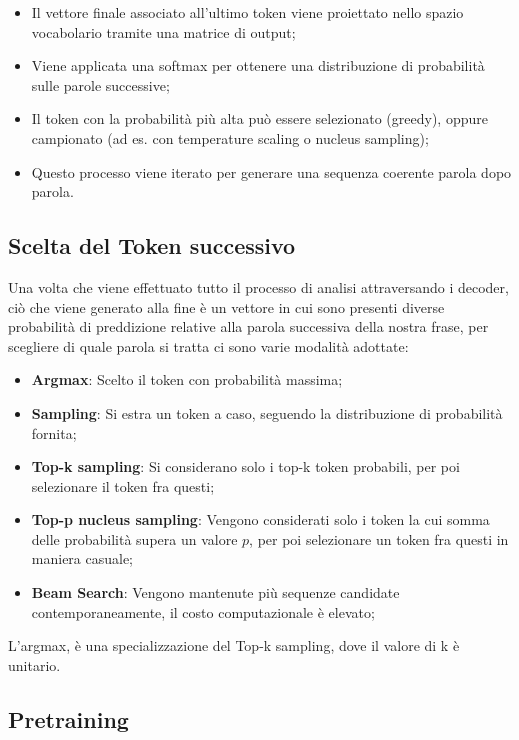 \begin{itemize}
    \item Il vettore finale associato all’ultimo token viene proiettato nello spazio vocabolario tramite una matrice di output;
    \item Viene applicata una softmax per ottenere una distribuzione di probabilità sulle parole successive;
    \item Il token con la probabilità più alta può essere selezionato (greedy), oppure campionato (ad es. con temperature scaling o nucleus sampling);
    \item Questo processo viene iterato per generare una sequenza coerente parola dopo parola.
\end{itemize}

\subsection{Scelta del Token successivo}
Una volta che viene effettuato tutto il processo di analisi attraversando i decoder, ciò che viene generato alla fine è un vettore in cui sono presenti diverse probabilità di preddizione relative alla parola successiva della nostra frase, per scegliere di quale parola si tratta ci sono varie modalità adottate:

\begin{itemize}
    \item\textbf{Argmax}: Scelto il token con probabilità massima;
    \item\textbf{Sampling}: Si estra un token a caso, seguendo la distribuzione di probabilità fornita;
    \item\textbf{Top-k sampling}: Si considerano solo i top-k token probabili, per poi selezionare il token fra questi;
    \item\textbf{Top-p nucleus sampling}: Vengono considerati solo i token la cui somma delle probabilità supera un valore $p$, per poi selezionare un token fra questi in maniera casuale;
    \item\textbf{Beam Search}: Vengono mantenute più sequenze candidate contemporaneamente, il costo computazionale è elevato;
\end{itemize}

\begin{Osservazione}
    L'argmax, è una specializzazione del Top-k sampling, dove il valore di k è unitario.
\end{Osservazione}

\subsection{Pretraining}

